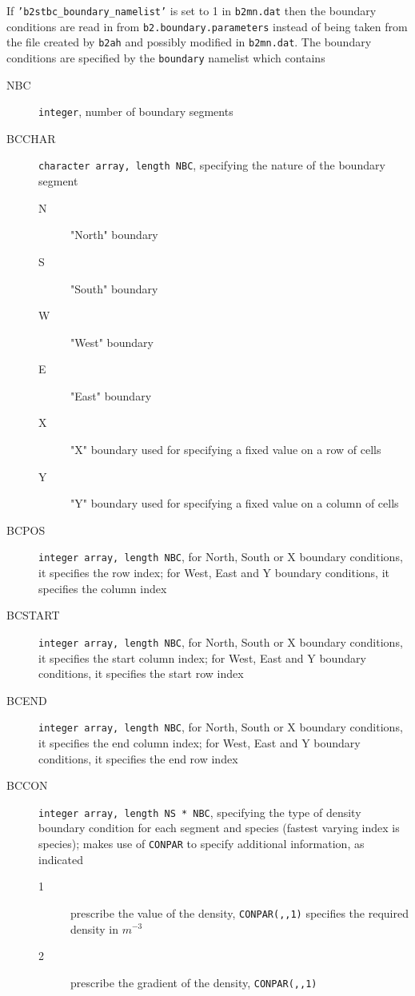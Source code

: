 \documentclass[a4paper,10pt]{report}
\begin{document}
If {\tt 'b2stbc\_boundary\_namelist'} is set to 1 in {\tt b2mn.dat}
then the boundary conditions are read in from
{\tt b2.boundary.parameters} instead of being taken from the file
created by {\tt b2ah} and possibly modified in {\tt b2mn.dat}.
The boundary conditions are specified by the {\tt boundary} namelist
which contains
\begin{description}
\item[NBC] {\tt integer}, number of boundary segments
\item[BCCHAR] {\tt character array, length NBC}, specifying the nature of
  the boundary segment
  \begin{description}
  \item[N] "North" boundary
  \item[S] "South" boundary
  \item[W] "West" boundary
  \item[E] "East" boundary
  \item[X] "X" boundary used for specifying a fixed value on
  a row of cells
  \item[Y] "Y" boundary used for specifying a fixed value on
  a column of cells
  \end{description}
\item[BCPOS] {\tt integer array, length NBC}, for North, South
  or X boundary conditions, it specifies the row index; for West, East
  and Y boundary conditions, it specifies the column index
\item[BCSTART] {\tt integer array, length NBC}, for North,
  South or X boundary conditions, it specifies the start column index;
  for West, East and Y boundary conditions, it specifies the start row
  index
\item[BCEND] {\tt integer array, length NBC}, for North, South
  or X boundary conditions, it specifies the end column index; for
  West, East and Y boundary conditions, it specifies the end row index
\item[BCCON] {\tt integer array, length NS * NBC}, specifying
  the type of density boundary condition for each segment and species
  (fastest varying index is species); makes use of {\tt CONPAR} to
  specify additional information, as indicated
  \begin{description}
  \item[1] prescribe the value of the density, {\tt CONPAR(,,1)}
  specifies the required density in $m^{-3}$
  \item[2] prescribe the gradient of the density, {\tt CONPAR(,,1)}

\end{description}
\end{description}
\end{document}
